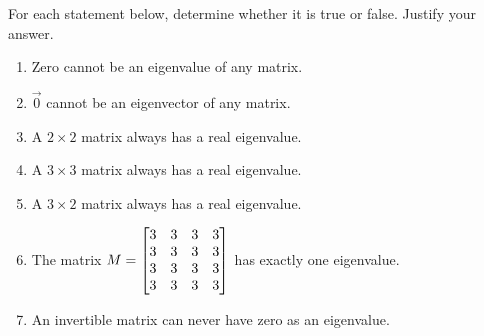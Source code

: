 \begin{exercises}
\begin{problist}
		\prob For each statement below, determine whether it is true or false. Justify your answer.
		\begin{enumerate}
			\item Zero cannot be an eigenvalue of any matrix.
			\item $\vec 0$ cannot be an eigenvector of any matrix.
			\item A $2\times 2$ matrix always has a real eigenvalue.
			\item A $3\times 3$ matrix always has a real eigenvalue.
			\item A $3\times 2$ matrix always has a real eigenvalue.
			\item The matrix $M = \mat{3&3&3&3\\3&3&3&3\\3&3&3&3\\3&3&3&3}$
				has exactly one eigenvalue.
			\item An invertible matrix can never have zero as an eigenvalue.
		\end{enumerate}
	\end{problist}
\end{exercises}
